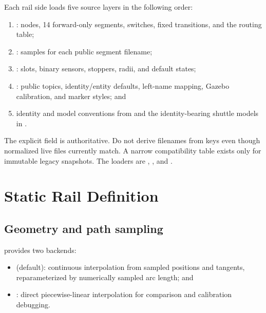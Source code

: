 Each rail side loads five source layers in the following order:

\begin{enumerate}
  \item {}:
        nodes, 14 forward-only segments, switches, fixed transitions, and the
        routing table;
  \item {}:
         samples for each public segment filename;
  \item {}:
        slots, binary sensors, stoppers, radii, and default states;
  \item {}:
        public topics, identity/entity defaults, left-name mapping, Gazebo
        calibration, and marker styles; and
  \item identity and model conventions from
         and
        the identity-bearing shuttle models in
        .
\end{enumerate}

The explicit  field is authoritative.
Do not derive filenames from keys even though normalized live files currently
match. A narrow compatibility table exists only for immutable legacy snapshots.
The loaders are
,
, and
.

\section{Static Rail Definition}

\subsection{Geometry and path sampling}

 provides
two backends:

\begin{itemize}
  \item {} (default): continuous interpolation from sampled
        positions and tangents, reparameterized by numerically sampled arc
        length; and
  \item {}: direct piecewise-linear interpolation for comparison
        and calibration debugging.
\end{itemize}

